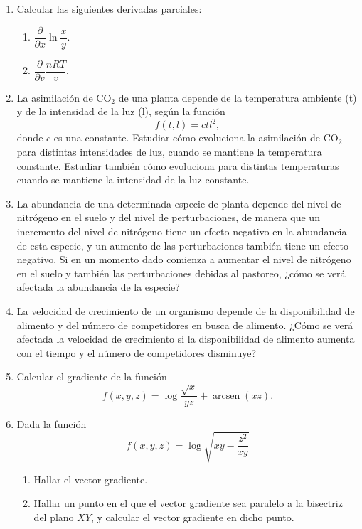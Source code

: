 \documentclass[a4paper,titlepage]{article}
\DeclareMathOperator{\arcsen}{arcsen}
\theoremstyle{solution}
\begin{document}
\begin{enumerate}[resume, leftmargin=*]
\item Calcular las siguientes derivadas parciales:
\begin{multicols}{2}
\begin{enumerate}
\item $\dfrac{\partial}{\partial x}\ln \dfrac{x}{y}$.
\item $\dfrac{\partial}{\partial v}\dfrac{nRT}{v}$.
\end{enumerate}
\end{multicols}

\item La asimilación de CO$_2$ de una planta depende de la temperatura ambiente (t) y de la intensidad de la luz (l), según la función 
\[
f(t,l) = ctl^2,
\]
donde $c$ es una constante. 
Estudiar cómo evoluciona la asimilación de CO$_2$ para distintas intensidades de luz, cuando se mantiene la temperatura constante. 
Estudiar también cómo evoluciona para distintas temperaturas cuando se mantiene la intensidad de la luz constante.   

\item La abundancia de una determinada especie de planta depende del nivel de nitrógeno en el suelo y del nivel de perturbaciones, de manera que un incremento del nivel de nitrógeno tiene un efecto negativo en la abundancia de esta especie, y un aumento de las perturbaciones también tiene un efecto negativo.
Si en un momento dado comienza a aumentar el nivel de nitrógeno en el suelo y también las perturbaciones debidas al pastoreo, ¿cómo se verá afectada la abundancia de la especie?

\item La velocidad de crecimiento de un organismo depende de la disponibilidad de alimento y del número de competidores en busca de alimento. 
¿Cómo se verá afectada la velocidad de crecimiento si la disponibilidad de alimento aumenta con el tiempo y el número de competidores disminuye?

\item Calcular el gradiente de la función
\[
f(x,y,z)=\log \frac{\sqrt{x}}{yz}+\arcsen (xz).
\]

\item Dada la función
\[
f(x,y,z)=\log \sqrt{xy-\frac{z^2}{xy}}
\]
\begin{enumerate}
\item Hallar el vector gradiente.
\item Hallar un punto en el que el vector gradiente sea paralelo a la bisectriz del plano $XY$, y calcular el vector gradiente en dicho punto.
\end{enumerate}


\end{enumerate}
\end{document}

